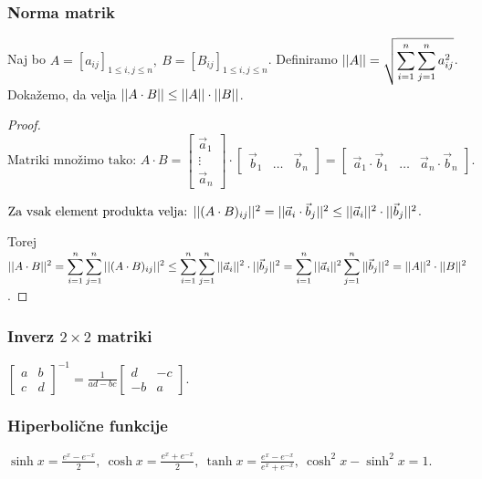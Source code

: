 \subsubsection*{Norma matrik}
Naj bo $A = [a_{ij}]_{1 \leq i, j \leq n}, \ B = [B_{ij}]_{1 \leq i, j \leq n}$. Definiramo $\displaystyle ||A|| = \sqrt{\sum_{i=1}^n \sum_{j=1}^n a_{ij}^2}$. Dokažemo, da velja $||A \cdot B|| \leq ||A|| \cdot ||B||$.
\begin{proof}
    $\text{Matriki množimo tako: } A \cdot B = \begin{bmatrix}
        \vec{a}_1 \\ \vdots \\ \vec{a}_n
    \end{bmatrix} \cdot \begin{bmatrix}
        \vec{b}_1 & \ldots & \vec{b}_n
    \end{bmatrix} = \begin{bmatrix}
        \vec{a}_1 \cdot \vec{b}_1 & \ldots & \vec{a}_n \cdot \vec{b}_n
    \end{bmatrix}.$

    $\text{Za vsak element produkta velja: } ||(A \cdot B)_{ij}||^2 = ||\vec{a}_i \cdot \vec{b}_j||^2 \leq ||\vec{a}_i||^2 \cdot ||\vec{b}_j||^2$.

    Torej $\displaystyle ||A \cdot B||^2 = \sum_{i=1}^n \sum_{j=1}^n ||(A \cdot B)_{ij}||^2 \leq \sum_{i=1}^n \sum_{j=1}^n ||\vec{a}_i||^2 \cdot ||\vec{b}_j||^2 = \sum_{i=1}^n ||\vec{a}_i||^2 \sum_{j=1}^n ||\vec{b}_j||^2  = ||A||^2 \cdot ||B||^2$.
\end{proof}

\subsubsection*{Inverz $2 \times 2$ matriki}
$\displaystyle \begin{bmatrix}
    a & b \\ c & d
\end{bmatrix}^{-1} = \frac{1}{ad - bc} \begin{bmatrix}
    d & -c \\ -b & a
\end{bmatrix}$.

\subsubsection*{Hiperbolične funkcije}
$\displaystyle \sinh x = \frac{e^x - e^{-x}}{2}, \ \cosh x = \frac{e^x + e^{-x}}{2}, \ \tanh x = \frac{e^x - e^{-x}}{e^x + e^{-x}}, \ \cosh^2 x - \sinh^2 x = 1$.
